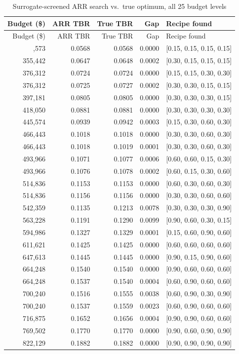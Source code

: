 \documentclass[11pt]{article}
\begin{document}
\begin{longtable}{rrrrl}
\caption{Surrogate-screened ARR search vs.\ true optimum, all 25 budget levels}\label{t:surrogate}\\
\toprule
Budget (\$) & ARR TBR & True TBR & Gap & Recipe found \\
\midrule
\endfirsthead
\toprule
Budget (\$) & ARR TBR & True TBR & Gap & Recipe found \\
\midrule
\endhead
\bottomrule
\endfoot
334,573 & 0.0568 & 0.0568 & 0.0000 & [0.15, 0.15, 0.15, 0.15] \\
355,442 & 0.0647 & 0.0648 & 0.0002 & [0.30, 0.15, 0.15, 0.15] \\
376,312 & 0.0724 & 0.0724 & 0.0000 & [0.15, 0.15, 0.30, 0.30] \\
376,312 & 0.0725 & 0.0727 & 0.0002 & [0.30, 0.30, 0.15, 0.15] \\
397,181 & 0.0805 & 0.0805 & 0.0000 & [0.30, 0.30, 0.30, 0.15] \\
418,050 & 0.0881 & 0.0881 & 0.0000 & [0.30, 0.30, 0.30, 0.30] \\
445,574 & 0.0939 & 0.0942 & 0.0003 & [0.15, 0.30, 0.60, 0.30] \\
466,443 & 0.1018 & 0.1018 & 0.0000 & [0.30, 0.30, 0.60, 0.30] \\
466,443 & 0.1018 & 0.1019 & 0.0001 & [0.30, 0.30, 0.60, 0.30] \\
493,966 & 0.1071 & 0.1077 & 0.0006 & [0.60, 0.60, 0.15, 0.30] \\
493,966 & 0.1076 & 0.1078 & 0.0002 & [0.60, 0.15, 0.30, 0.60] \\
514,836 & 0.1153 & 0.1153 & 0.0000 & [0.60, 0.30, 0.60, 0.30] \\
514,836 & 0.1156 & 0.1156 & 0.0000 & [0.30, 0.30, 0.60, 0.60] \\
542,359 & 0.1135 & 0.1213 & 0.0078 & [0.30, 0.30, 0.30, 0.90] \\
563,228 & 0.1191 & 0.1290 & 0.0099 & [0.90, 0.60, 0.30, 0.15] \\
594,986 & 0.1327 & 0.1329 & 0.0001 & [0.15, 0.60, 0.90, 0.60] \\
611,621 & 0.1425 & 0.1425 & 0.0000 & [0.60, 0.60, 0.60, 0.60] \\
647,613 & 0.1445 & 0.1445 & 0.0000 & [0.90, 0.15, 0.90, 0.60] \\
664,248 & 0.1540 & 0.1540 & 0.0000 & [0.90, 0.60, 0.60, 0.60] \\
664,248 & 0.1537 & 0.1540 & 0.0004 & [0.60, 0.90, 0.60, 0.60] \\
700,240 & 0.1516 & 0.1555 & 0.0038 & [0.60, 0.90, 0.30, 0.90] \\
700,240 & 0.1537 & 0.1559 & 0.0023 & [0.60, 0.90, 0.60, 0.60] \\
716,875 & 0.1652 & 0.1656 & 0.0004 & [0.90, 0.90, 0.60, 0.60] \\
769,502 & 0.1770 & 0.1770 & 0.0000 & [0.90, 0.60, 0.90, 0.90] \\
822,129 & 0.1882 & 0.1882 & 0.0000 & [0.90, 0.90, 0.90, 0.90] \\
\end{longtable}
\end{document}

